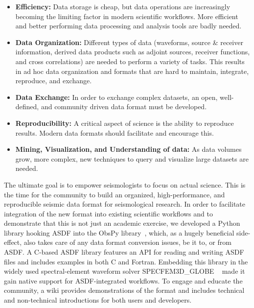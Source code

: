 \begin{itemize}

    \item \textbf{Efficiency:} Data storage is cheap, but data operations are
        increasingly becoming the limiting factor in modern scientific
        workflows. More efficient and better performing data processing and
        analysis tools are badly needed.

    \item \textbf{Data Organization:} Different types of data (waveforms,
        source \& receiver information, derived data products such as adjoint
        sources, receiver functions, and cross correlations) are needed to
        perform a variety of tasks. This results in ad hoc data organization
        and formats that are hard to maintain, integrate, reproduce, and
        exchange.

    \item \textbf{Data Exchange:} In order to exchange complex datasets, an
        open, well-defined, and community driven data format must be developed.

    \item \textbf{Reproducibility:} A critical aspect of science is the ability
        to reproduce results. Modern data formats should facilitate and
        encourage this.

    \item \textbf{Mining, Visualization, and Understanding of data:} As data
        volumes grow, more complex, new techniques to query and visualize large
        datasets are needed.
\end{itemize}

The ultimate goal is to empower seismologists to focus on actual science. This
is the time for the community to build an organized, high-performance, and
reproducible seismic data format for seismological research.
In order to facilitate integration of the new format into existing scientific
workflows and to demonstrate that this is not just an academic exercise, we
developed a Python library hooking ASDF into the ObsPy library~\cite{obspy2010},
which, as a hugely beneficial side-effect, also takes
care of any data format conversion issues, be it to, or from ASDF.  A C-based
ASDF library features an API for reading and writing ASDF files and includes
examples in both C and Fortran.  Embedding this library in the widely used
spectral-element waveform solver SPECFEM3D\_GLOBE
~\cite{KoTr02a, KoTr02b} made it gain native support for
ASDF-integrated workflows. To engage and educate the community, a wiki provides
demonstrations of the format and includes technical and non-technical
introductions for both users and developers.

